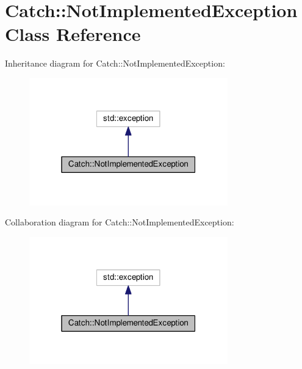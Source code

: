 \hypertarget{classCatch_1_1NotImplementedException}{}\section{Catch\+:\+:Not\+Implemented\+Exception Class Reference}
\label{classCatch_1_1NotImplementedException}


Inheritance diagram for Catch\+:\+:Not\+Implemented\+Exception\+:
\nopagebreak
\begin{figure}[H]
\begin{center}
\leavevmode
\includegraphics[width=244pt]{classCatch_1_1NotImplementedException__inherit__graph}
\end{center}
\end{figure}


Collaboration diagram for Catch\+:\+:Not\+Implemented\+Exception\+:
\nopagebreak
\begin{figure}[H]
\begin{center}
\leavevmode
\includegraphics[width=244pt]{classCatch_1_1NotImplementedException__coll__graph}
\end{center}
\end{figure}
